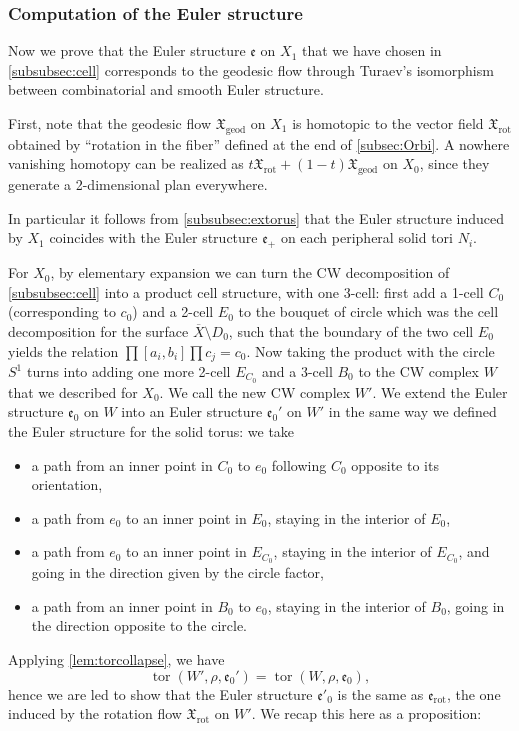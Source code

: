 \documentclass[10pt]{amsart}
\theoremstyle{plain}
\theoremstyle{definition}
\theoremstyle{remark}
\newcommand{\rot}{\mathrm{rot}}
\newcommand{\geod}{\mathrm{geod}}
\numberwithin{equation}{section}
\DeclareMathOperator{\tor}{tor}
\begin{document}
\subsubsection{Computation of the Euler structure}
\label{subsubsec:Euler}
Now we prove that the Euler structure $\mathfrak e$ on $X_1$ that we have chosen in \cref{subsubsec:cell} corresponds to the geodesic flow through Turaev's isomorphism between combinatorial and smooth Euler structure.

First, note that the geodesic flow $\mathfrak X_\geod$ on $X_1$ is homotopic to the vector field $\mathfrak X_{\rot}$
obtained by ``rotation in the fiber'' defined at the end of \cref{subsec:Orbi}. A nowhere vanishing homotopy can be realized as $t \mathfrak X_\rot + (1-t) \mathfrak X_{\geod}$ on $X_0$, since they generate a 2-dimensional plan everywhere.

In particular it follows from \cref{subsubsec:extorus} that the Euler structure induced by $X_1$ coincides with the Euler structure $\mathfrak e_+$ on each peripheral solid tori $N_i$.

For $X_0$, by elementary expansion we can turn the CW decomposition of \cref{subsubsec:cell} into a product cell structure, with one 3-cell:
first add a 1-cell $C_0$ (corresponding to $c_0$) and a 2-cell $E_0$ to the bouquet of circle which was the cell decomposition for the surface $\overline X \setminus D_0$, such that the boundary of the two cell $E_0$ yields the relation $\prod[a_i, b_i]\prod c_j = c_0$. Now taking the product with the circle $S^1$ turns into adding one more 2-cell $E_{C_0}$ and a 3-cell $B_0$ to the CW complex $W$ that we described for $X_0$. We call the new CW complex $W'$. We extend the Euler structure $\mathfrak e_0$ on $W$ into an Euler structure $\mathfrak e_0'$ on $W'$ in the same way we defined the Euler structure for the solid torus: we take
\begin{itemize}
\item
a path from an inner point in $C_0$ to $e_0$ following $C_0$ opposite to its orientation,
\item
a path from $e_0$ to an inner point in $E_0$, staying in the interior of $E_0$,
\item
a path from $e_0$ to an inner point in $E_{C_0}$, staying in the interior of $E_{C_0}$, and going in the direction given by the circle factor,
\item
a path from an inner point in $B_0$ to $e_0$, staying in the interior of $B_0$, going in the direction opposite to the circle.
\end{itemize}
Applying \cref{lem:torcollapse}, we have
\[
\tor(W', \rho, \mathfrak e_0') = \tor(W, \rho, \mathfrak e_0),
\]
hence we are led to show that the Euler structure $\mathfrak e'_0$ is the same as $\mathfrak e_\rot$, the one induced by the rotation flow $\mathfrak X_\rot$ on $W'$. We recap this here as a proposition:
\end{document}
